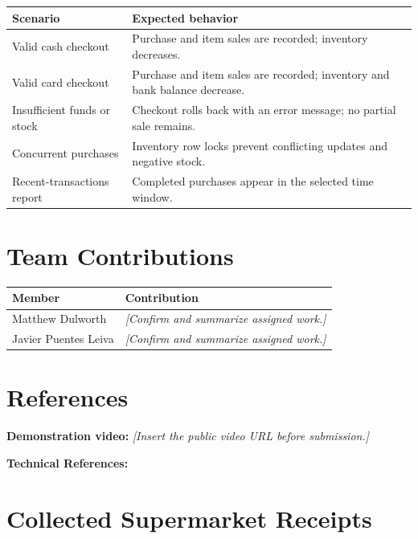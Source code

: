 \documentclass[11pt,letterpaper]{article}
\begin{document}
\begin{center}
\small
\begin{tabularx}{\textwidth}{@{}p{}X@{}}
\hline
Scenario & Expected behavior \\ \hline
Valid cash checkout & Purchase and item sales are recorded; inventory decreases. \\
Valid card checkout & Purchase and item sales are recorded; inventory and bank balance decrease. \\
Insufficient funds or stock & Checkout rolls back with an error message; no partial sale remains. \\
Concurrent purchases & Inventory row locks prevent conflicting updates and negative stock. \\
Recent-transactions report & Completed purchases appear in the selected time window. \\ \hline
\end{tabularx}
\end{center}


\section{Team Contributions}

\begin{center}
\small
\begin{tabularx}{\textwidth}{@{}p{}X@{}}
\hline
Member & Contribution \\ \hline
Matthew Dulworth & \emph{[Confirm and summarize assigned work.]} \\
Javier Puentes Leiva & \emph{[Confirm and summarize assigned work.]} \\ \hline
\end{tabularx}
\end{center}


\section{References}

\textbf{Demonstration video:} \emph{[Insert the public video URL before submission.]}

\vspace{0.35em}
\noindent\textbf{Technical References:} 

\clearpage
\appendix
\section{Collected Supermarket Receipts}
\label{app:receipts}
\end{document}
